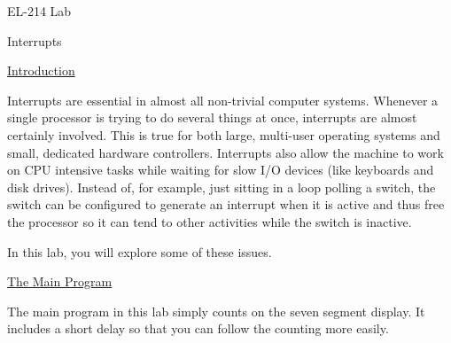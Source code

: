 %
%
%
%

\setlength{\parindent}{0em}
\setlength{\parskip}{1.75ex plus0.5ex minus0.5ex}



\centerline{\Large{EL-214 Lab}}
\centerline{\Large{Interrupts}}
\vspace{0.5in}

\underline{\large{Introduction}}

Interrupts are essential in almost all non-trivial computer systems.
Whenever a single processor is trying to do several things at once,
interrupts are almost certainly involved. This is true for both large,
multi-user operating systems and small, dedicated hardware controllers.
Interrupts also allow the machine to work on CPU intensive tasks while
waiting for slow I/O devices (like keyboards and disk drives). Instead of,
for example, just sitting in a loop polling a switch, the switch can be
configured to generate an interrupt when it is active and thus free the
processor so it can tend to other activities while the switch is inactive.

In this lab, you will explore some of these issues.

\underline{\large{The Main Program}}

The main program in this lab simply counts on the seven segment display. It
includes a short delay so that you can follow the counting more easily.

